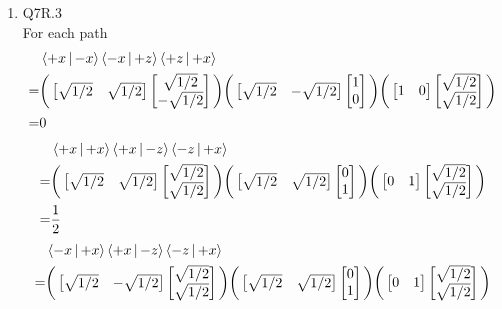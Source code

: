 \documentclass{article}
\providecommand{\bigp}[1]{\bigg( #1 \bigg)}
\providecommand{\Matrix}[1] {\begin{bmatrix} #1 \end{bmatrix}}
\theoremstyle{definition}
\theoremstyle{plain}
\begin{document}
\begin {enumerate}[itemindent=30pt,label=\bf Exercise {\arabic*}:]
\subitem By sending the electron to the $SG_{x}$, we can get another equation.    
	$$|\Braket{+x \mid \psi}|^2 = 0.77$$
\subitem According to this set of equations, we can get know that 
\begin{align*}
	&\dfrac{1}{2}(a^2 + b^2) = 0.77\\
	&ab = 0.27
\end{align*} 
\subitem Because $1 \cdot 0 = 0$, $\dfrac{24}{25} \cdot \dfrac{7}{25} = 0.27$, we can conclude that $a = \pm 24/25, b = \pm 7/25$ 
\item Q7R.3 \\
\subitem For each path
\begin{align*}
	 &\Braket{+x|-x} \Braket{-x|+z} \Braket{+z|+x} \\
    =& \bigg( \begin{bmatrix} \sqrt{1/2} & \sqrt{1/2} \end{bmatrix} \begin{bmatrix} \sqrt{1/2}\\ -\sqrt{1/2} \end{bmatrix} \bigg) \bigg( \begin{bmatrix} \sqrt{1/2} & -\sqrt{1/2} \end{bmatrix} \begin{bmatrix} 1\\0 \end{bmatrix} \bigg)\bigg( \begin{bmatrix} 1 & 0 \end{bmatrix} \begin{bmatrix} \sqrt{1/2} \\ \sqrt{1/2} \end{bmatrix} \bigg)\\
    =&0
\end{align*}
\begin{align*}
	&\Braket{+x|+x} \Braket{+x|-z} \Braket{-z|+x}\\
   =&\bigp{ \Matrix{ \sqrt{1/2} & \sqrt{1/2}} \Matrix{ \sqrt{1/2}\\ \sqrt{1/2}}} \bigp{ \Matrix{\sqrt{1/2} & \sqrt{1/2}} \Matrix{0\\1}} \bigp{\Matrix{0 & 1} \Matrix{\sqrt{1/2} \\ \sqrt{1/2}}}\\
   =& \dfrac{1}{2} 
\end{align*}
\begin{align*}
	&\Braket{-x|+x} \Braket{+x|-z} \Braket{-z|+x}\\
   =&\bigp{ \Matrix{ \sqrt{1/2} & -\sqrt{1/2}} \Matrix{ \sqrt{1/2}\\ \sqrt{1/2}}} \bigp{ \Matrix{\sqrt{1/2} & \sqrt{1/2}} \Matrix{0\\1}} \bigp{\Matrix{0 & 1} \Matrix{\sqrt{1/2} \\ \sqrt{1/2}}}\\

\end{align*}
\end{enumerate}
\end{document}
